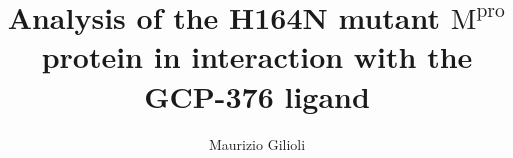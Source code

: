 \documentclass[fleqn,10pt]{wlscirep}
\title{Analysis of the H164N mutant $\text{M}^{\text{pro}}$ protein in interaction with the GCP-376 ligand}
\date{}
\author[]{Maurizio Gilioli}
\begin{document}
\maketitle

\tableofcontents















{\footnotesize

}
\end{document}
